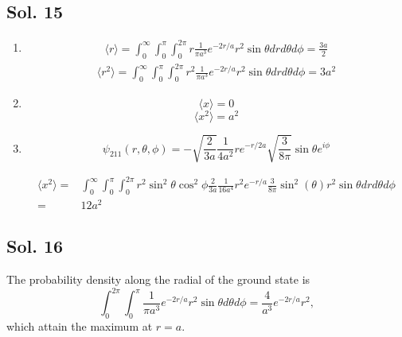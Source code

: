     \subsection*{Sol. 15}
    \begin{enumerate}
        \item 
        \begin{align*}
            \langle r\rangle
            =\int_0^\infty 
            \int_0^\pi 
            \int_0^{2\pi}
            r
            \frac{1}{\pi a^3}
            e^{-2r/a}
            r^2\sin\theta
            drd\theta d\phi
            =\frac{3a}{2}
        \end{align*}
        \begin{align*}
            \langle r^2\rangle
            =\int_0^\infty 
            \int_0^\pi 
            \int_0^{2\pi}
            r^2
            \frac{1}{\pi a^3}
            e^{-2r/a}
            r^2\sin\theta
            drd\theta d\phi
            =3a^2
        \end{align*}
        \item 
        $$
        \langle x\rangle = 0
        $$
        $$
        \langle x^2\rangle = a^2
        $$
        \item 
        $$
        \psi_{211}(r,\theta,\phi)
          =
          -\sqrt{\frac{2}{3a}}
          \frac{1}{4a^2}
          r
          e^{-r/2a}
          \sqrt{\frac{3}{8\pi}}
          \sin\theta e^{i\phi}
        $$

        \begin{align*}
            \langle x^2\rangle
            =&
            \int_0^\infty 
            \int_0^\pi 
            \int_0^{2\pi}
            r^2\sin^2\theta\cos^2\phi 
            \frac{2}{3a}
            \frac{1}{16a^4}
            r^2
            e^{-r/a}
            \frac{3}{8\pi}
            \sin^2(\theta )
            r^2\sin\theta 
            drd\theta d\phi\\
            =&12a^2
        \end{align*}
    \end{enumerate}

    \subsection*{Sol. 16}
    The probability density along the radial of the ground state is 
    $$
    \int_0^{2\pi}
    \int_0^{\pi}
    \frac{1}{\pi a^3}
            e^{-2r/a}
            r^2\sin\theta
            d\theta d\phi
            =
            \frac{4}{ a^3}
            e^{-2r/a}
            r^2,
    $$
    which attain the maximum at 
    $
    r=a.
    $

